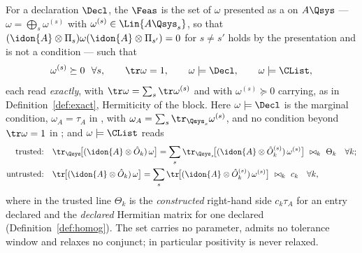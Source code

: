 
\begin{definition}\label{def:feasible}
For a declaration $\Decl$, the
$\Feas$ is the set of $\omega$ presented as a
 on $A\Qsys$ --- $\omega=\bigoplus_s\omega^{(s)}$ with $\omega^{(s)}\in\Lin{A\Qsys_s}$,
so that $(\idon{A}\otimes\Pi_s)\omega(\idon{A}\otimes\Pi_{s'})=0$ for
$s\ne s'$ holds by the presentation and is not a condition --- such that
\begin{equation}\label{eq:feas}
  \omega^{(s)}\succeq0\ \ \forall s,\qquad \tr\omega=1,\qquad
  \omega\models\Decl,\qquad \omega\models\CList ,
\end{equation}
each read \emph{exactly}, with $\tr\omega=\sum_s\tr\omega^{(s)}$ and with
$\omega^{(s)}\succeq0$ carrying, as in Definition~\ref{def:exact},
Hermiticity of the block. Here $\omega\models\Decl$ is the marginal condition,
$\omega_A=\tau_A$ in , with
$\omega_A=\sum_s\tr_{\Qsys_s}\omega^{(s)}$, and no condition beyond
$\tr\omega=1$ in ; and $\omega\models\CList$ reads
\begin{equation}\label{eq:feas-modes}
\begin{aligned}
  \text{trusted:}\quad&
  \tr_{\Qsys}\!\big[(\idon{A}\otimes\hat O_k)\,\omega\big]
  =\sum_s\tr_{\Qsys_s}\!\big[(\idon{A}\otimes\hat O^{(s)}_k)\,\omega^{(s)}\big]
  \ \bowtie_k\ \Theta_k
  \quad\forall k;\\
  \text{untrusted:}\quad&
  \tr\!\big[(\idon{A}\otimes\hat O_k)\,\omega\big]
  =\sum_s\tr\!\big[(\idon{A}\otimes\hat O^{(s)}_k)\,\omega^{(s)}\big]
  \ \bowtie_k\ c_k
  \quad\forall k ,
\end{aligned}
\end{equation}
where in the trusted line $\Theta_k$ is the \emph{constructed} right-hand side
$c_k\tau_A$ for an entry declared  and the \emph{declared}
Hermitian matrix for one declared 
(Definition~\ref{def:homog}). The set carries no parameter, admits no
tolerance window and relaxes no conjunct; in particular positivity is never
relaxed.


\end{definition}
